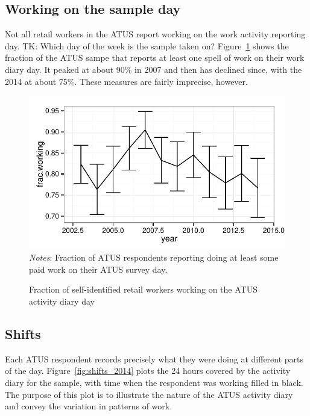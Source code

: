 \documentclass[11pt]{article}
\begin{document}
% 

\subsection{Working on the sample day}
Not all retail workers in the ATUS report working on the work activity reporting day.
TK: Which day of the week is the sample taken on?
Figure~\ref{fig:frac_working} shows the fraction of the ATUS sampe that reports at least one spell of work on their work diary day. 
It peaked at about 90\% in 2007 and then has declined since, with the 2014 at about 75\%.
These measures are fairly imprecise, however. 

\begin{figure}[h]
\centering 
\caption{Fraction of self-identified retail workers working on the ATUS activity diary day} \label{fig:frac_working}
\begin{minipage}{0.95 \linewidth}
\includegraphics[width = \linewidth]{./plots/frac_working.pdf}
\\
\emph{Notes}: Fraction of ATUS respondents reporting doing at least some paid work on their ATUS survey day.  
\end{minipage} 
\end{figure}

\subsection{Shifts}

Each ATUS respondent records precisely what they were doing at different parts of the day. 
Figure~\ref{fig:shifts_2014} plots the 24 hours covered by the activity diary for the sample, with time when the respondent was working filled in black.
The purpose of this plot is to illustrate the nature of the ATUS activity diary and convey the variation in patterns of work. 
\end{document}
